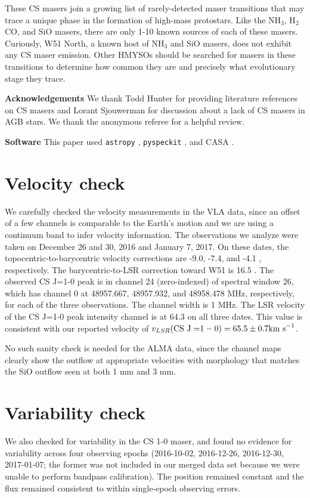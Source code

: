 \documentclass[twocolumn]{aastex62}
\begin{document}
These CS masers join a growing list of rarely-detected maser transitions
that may trace a unique phase in the formation of high-mass protostars.
Like the NH$_3$, H$_2$CO, and SiO masers, there are only 1-10 known sources of
each of these masers.  Curiously, W51 North, a known host of NH$_3$ and SiO masers,
does not exhibit any CS maser emission.  Other HMYSOs should be searched for
masers in these transitions to determine how common they are and precisely
what evolutionary stage they trace.

\textbf{Acknowledgements}
We thank Todd Hunter for providing literature references on CS masers and
Lorant Sjouwerman for discussion about a lack of CS masers in AGB stars.
We thank the anonymous referee for a helpful review.

\textbf{Software}
This paper used \texttt{astropy}
\citep{Astropy-Collaboration2013a,Astropy-Collaboration2018a},
\texttt{pyspeckit} \citep{Ginsburg2011c}, and CASA \citep{McMullin2007a}.

\appendix
\section{Velocity check}
We carefully checked the velocity measurements in the VLA data, since an offset
of a few channels is comparable to the Earth's motion and we are using a
continuum band to infer velocity information.  The observations we analyze were
taken on December 26 and 30, 2016 and January 7, 2017.  On these dates, the
topocentric-to-barycentric velocity corrections are -9.0, -7.4, and -4.1 \kms,
respectively.  The barycentric-to-LSR correction toward W51 is 16.5 \kms.  The
observed CS J=1-0 peak is in channel 24 (zero-indexed) of spectral window 26,
which has channel 0 at  48957.667, 48957.932, and 48958.478 MHz, respectively,
for each of the three observations.  The channel width is 1 MHz.  The LSR
velocity of the CS J=1-0 peak intensity channel is at 64.3 \kms on all three
dates.  This value is consistent with our reported velocity of
$v_{LSR}(\mathrm{CS~J=}1-0) = 65.5 \pm 0.7 \textrm{km~s}^{-1}$.

No such sanity check is needed for the ALMA data, since the channel maps
clearly show the outflow at appropriate velocities with morphology that matches
the SiO outflow seen at both 1 mm and 3 mm.

\section{Variability check}
We also checked for variability in the CS 1-0 maser, and found no evidence for
variability across four observing epochs (2016-10-02, 2016-12-26, 2016-12-30,
2017-01-07; the former was not included in our merged data set because we were unable
to perform bandpass calibration).  The position remained constant and the flux
remained consistent to within single-epoch observing errors.


\end{document}
